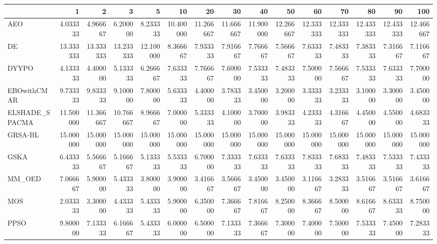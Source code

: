 \begin{tabular}{lrrrrrrrrrrrrrr}
\toprule
{} &        1   &        2   &        3   &        5   &        10  &        20  &        30  &        40  &        50  &        60  &        70  &        80  &        90  &        100 \\
\midrule
AEO            &   4.033333 &   4.966667 &   6.200000 &   8.233333 &  10.400000 &  11.266667 &  11.666667 &  11.900000 &  12.266667 &  12.333333 &  12.333333 &  12.433333 &  12.433333 &  12.466667 \\
DE             &  13.333333 &  13.333333 &  13.233333 &  12.100000 &   8.366667 &   7.933333 &   7.916667 &   7.766667 &   7.566667 &   7.633333 &   7.483333 &   7.383333 &   7.316667 &   7.116667 \\
DYYPO          &   4.133333 &   4.400000 &   5.133333 &   6.266667 &   7.633333 &   7.766667 &   7.600000 &   7.533333 &   7.483333 &   7.500000 &   7.566667 &   7.533333 &   7.633333 &   7.700000 \\
EBOwithCMAR    &   9.733333 &   9.833333 &   9.100000 &   7.800000 &   5.633333 &   4.400000 &   3.783333 &   3.450000 &   3.200000 &   3.333333 &   3.233333 &   3.100000 &   3.300000 &   3.450000 \\
ELSHADE\_SPACMA &  11.500000 &  11.366667 &  10.766667 &   8.966667 &   7.000000 &   5.333333 &   4.100000 &   3.700000 &   3.983333 &   4.233333 &   4.316667 &   4.450000 &   4.550000 &   4.683333 \\
GRSA-BL        &  15.000000 &  15.000000 &  15.000000 &  15.000000 &  15.000000 &  15.000000 &  15.000000 &  15.000000 &  15.000000 &  15.000000 &  15.000000 &  15.000000 &  15.000000 &  15.000000 \\
GSKA           &   6.433333 &   5.566667 &   5.166667 &   5.133333 &   5.533333 &   6.700000 &   7.333333 &   7.633333 &   7.633333 &   7.833333 &   7.683333 &   7.483333 &   7.533333 &   7.433333 \\
MM\_OED         &   7.066667 &   5.900000 &   5.433333 &   3.800000 &   3.900000 &   3.416667 &   3.566667 &   3.450000 &   3.450000 &   3.116667 &   3.283333 &   3.516667 &   3.516667 &   3.616667 \\
MOS            &   2.033333 &   3.300000 &   4.433333 &   5.433333 &   5.900000 &   6.350000 &   7.366667 &   7.816667 &   8.250000 &   8.366667 &   8.500000 &   8.616667 &   8.633333 &   8.750000 \\
PPSO           &   9.800000 &   7.133333 &   6.166667 &   5.433333 &   6.000000 &   6.500000 &   7.133333 &   7.366667 &   7.300000 &   7.400000 &   7.500000 &   7.533333 &   7.450000 &   7.283333 \\

\end{tabular}
